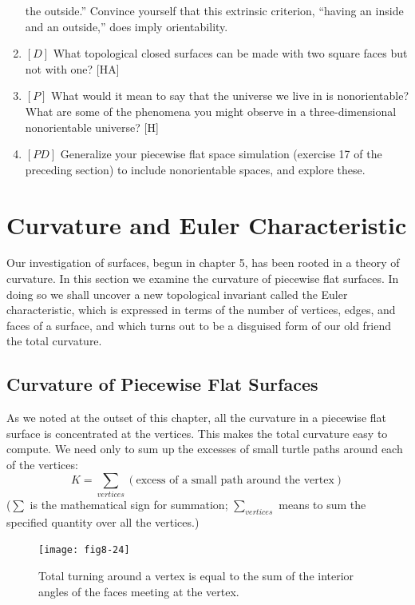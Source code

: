 \documentclass{book}
\begin{document}
\begin{enumerate}
the outside.'' Convince yourself that this extrinsic criterion, ``having an
inside and an outside,'' does imply orientability.
\item $[D]$ What topological closed surfaces can be made with two square
faces but not with one? [HA]
\item $[P]$ What would it mean to say that the universe we live in is
nonorientable? What are some of the phenomena you might observe
in a three-dimensional nonorientable universe? [H]
\item $[PD]$ Generalize your piecewise flat space simulation (exercise 17
of the preceding section) to include nonorientable spaces, and explore
these.
\end{enumerate}

\section{Curvature and Euler Characteristic}

Our investigation of surfaces, begun in chapter 5, has been rooted in
a theory of curvature. In this section we examine the curvature of
piecewise flat surfaces. In doing so we shall uncover a new topological
invariant called the Euler characteristic, which is expressed in terms of
the number of vertices, edges, and faces of a surface, and which turns
out to be a disguised form of our old friend the total curvature.

\subsection{Curvature of Piecewise Flat Surfaces}

As we noted at the outset of this chapter, all the curvature in a piecewise
flat surface is concentrated at the vertices. This makes the total curvature easy to compute. We need only to sum up the excesses of small
turtle paths around each of the vertices:
$$K = \sum_{vertices} (\text{excess of a small path around the vertex})$$
($\sum$ is the mathematical sign for summation; $\sum_{vertices}$ means to sum the
specified quantity over all the vertices.)

\begin{figure}
\begin{center}
\texttt{[image: fig8-24]}
\caption{Total turning around a vertex is equal to the sum of the interior angles of the faces meeting at the vertex.}
\end{center}
\end{figure}
\end{document}
